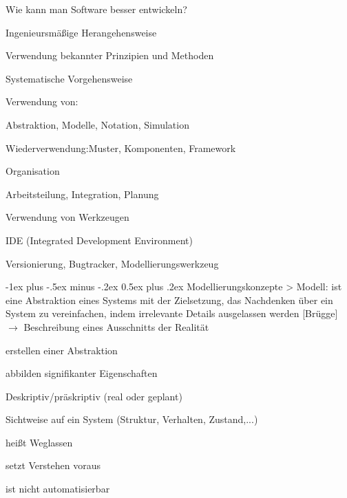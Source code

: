 \documentclass[a4paper]{article}
\makeatletter
\renewcommand{\section}{\@startsection{section}{1}{0mm}%
                                {-1ex plus -.5ex minus -.2ex}%
                                {0.5ex plus .2ex}%
                                {\normalfont\large\bfseries}}
\makeatother
\begin{document}
\begin{multicols}{3}
  Wie kann man Software besser entwickeln?
  \begin{itemize*}
    \item Ingenieursmäßige Herangehensweise
          \begin{itemize*}
            \item Verwendung bekannter Prinzipien und Methoden
            \item Systematische Vorgehensweise
          \end{itemize*}
    \item Verwendung von:
          \begin{itemize*}
            \item Abstraktion, Modelle, Notation, Simulation
            \item Wiederverwendung:Muster, Komponenten, Framework
          \end{itemize*}
    \item Organisation
          \begin{itemize*}
            \item Arbeitsteilung, Integration, Planung
          \end{itemize*}
    \item Verwendung von Werkzeugen
          \begin{itemize*}
            \item IDE (Integrated Development Environment)
            \item Versionierung, Bugtracker, Modellierungswerkzeug
          \end{itemize*}
  \end{itemize*}

  \section{Modellierungskonzepte}
  > Modell: ist eine Abstraktion eines Systems mit der Zielsetzung, das Nachdenken über ein System zu vereinfachen, indem irrelevante Details ausgelassen werden [Brügge]
  $\rightarrow$ Beschreibung eines Ausschnitts der Realität

  \begin{itemize*}
    \item erstellen einer Abstraktion
    \item abbilden signifikanter Eigenschaften
    \item Deskriptiv/präskriptiv (real oder geplant)
    \item Sichtweise auf ein System (Struktur, Verhalten, Zustand,...)
    \item heißt Weglassen
    \item setzt Verstehen voraus
    \item ist nicht automatisierbar
  \end{itemize*}


\end{multicols}
\end{document}

